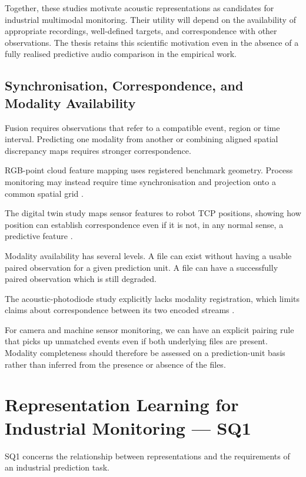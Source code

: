 Together, these studies motivate acoustic representations as candidates for industrial multimodal
monitoring. Their utility will depend on the availability of appropriate recordings, well-defined
targets, and correspondence with other observations. The thesis retains this scientific motivation
even in the absence of a fully realised predictive audio comparison in the empirical work.

\subsection{Synchronisation, Correspondence, and Modality Availability}

Fusion requires observations that refer to a compatible event, region or time interval. Predicting
one modality from another or combining aligned spatial discrepancy maps requires stronger
correspondence.

RGB-point cloud feature mapping uses registered benchmark geometry. Process monitoring may instead
require time synchronisation and projection onto a common spatial grid
\parencite{Costanzino2024Multimodal,Petrich2021Multimodal}.

The digital twin study maps sensor features to robot TCP positions, showing how position can
establish correspondence even if it is not, in any normal sense, a predictive feature
\parencite{Chen2023Multisensor}.

Modality availability has several levels. A file can exist without having a usable paired
observation for a given prediction unit. A file can have a successfully paired observation which is
still degraded.

The acoustic-photodiode study explicitly lacks modality registration, which limits claims about
correspondence between its two encoded streams \parencite{Li2022A}.

For camera and machine sensor monitoring, we can have an explicit pairing rule that picks up
unmatched events even if both underlying files are present. Modality completeness should therefore
be assessed on a prediction-unit basis rather than inferred from the presence or absence of the
files.

\section{Representation Learning for Industrial Monitoring --- SQ1}

SQ1 concerns the relationship between representations and the requirements of an industrial
prediction task.

